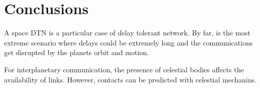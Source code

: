 \section{Conclusions}
\label{sec:con}

A space DTN is a particular case of delay tolerant network. By far, is the most extreme scenario where delays could be extremely long and the communications get disrupted by the planets orbit and motion.

For interplanetary communication, the presence of celestial bodies affects the availability of links. However, contacts can be predicted with celestial mechanins.